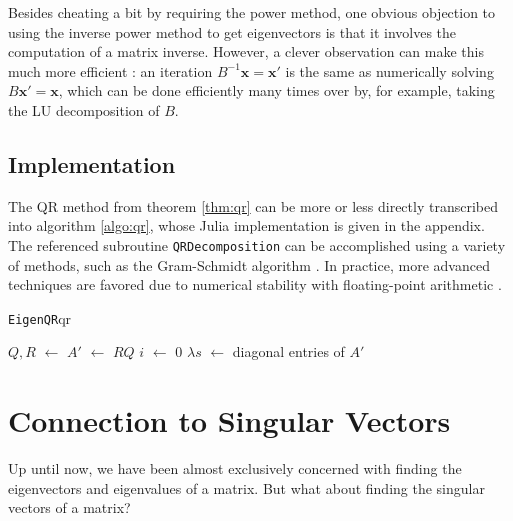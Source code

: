 \documentclass{article}
\let\vec\mathbf
\def\store{$\leftarrow$ }
\begin{document}
Besides cheating a bit by requiring the power method, one obvious objection to using the inverse power method to get eigenvectors is that it involves the computation of a matrix inverse. However, a clever observation can make this much more efficient \cite{ohio}: an iteration $B^{-1}\vec{x} = \vec{x}'$ is the same as numerically solving $B\vec{x}' = \vec{x}$, which can be done efficiently many times over by, for example, taking the LU decomposition of $B$.

\subsection{Implementation}
The QR method from theorem \ref{thm:qr} can be more or less directly transcribed into algorithm \ref{algo:qr}, whose Julia implementation is given in the appendix. The referenced subroutine \texttt{QRDecomposition} can be accomplished using a variety of methods, such as the Gram-Schmidt algorithm \cite[p.~327]{strang}. In practice, more advanced techniques are favored due to numerical stability with floating-point arithmetic \cite{cornell-gs}.

\begin{algo}{\texttt{EigenQR}}{qr}
  \begin{algorithm}[H]

    \BlankLine
    $Q,R$ \store {}\;
    $A'$ \store $RQ$\;
    $i$ \store $0$
    \While{$\lVert A' - A\rVert > \varepsilon$ {\normalfont and } $i < N$}{
      $Q,R$ \store \QRDecomposition{$A'$}\;
      $A$ \store $A'$\;
      $A'$ \store $RQ$\;
      $i$ \store $i + 1$\;
    }
    $\lambda s$ \store diagonal entries of $A'$\;
  \end{algorithm}
\end{algo}

\section{Connection to Singular Vectors}
Up until now, we have been almost exclusively concerned with finding the eigenvectors and eigenvalues of a matrix. But what about finding the singular vectors of a matrix?
\end{document}

